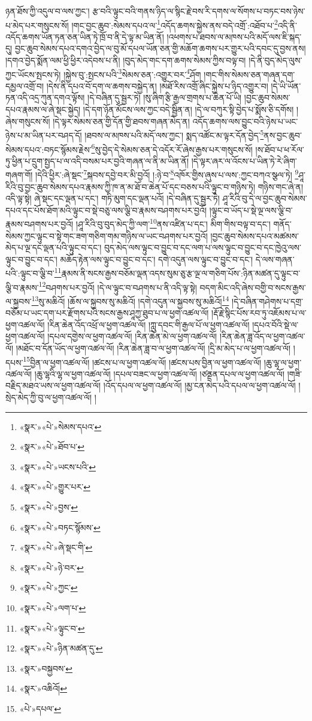 ཉན་ཐོས་ཀྱི་འདུལ་བ་ལས་ཀྱང་། རྩ་བའི་ལྟུང་བའི་གནས་ཉིད་ལ་སྙིང་རྗེ་བས་རི་དགས་ལ་སོགས་པ་བཏང་བས་ཉེས་པ་མེད་པར་གསུངས་སོ། །གང་བྱང་ཆུབ་:སེམས་དཔའ་ལ་\footnote{«སྣར་»«པེ་»སེམས་དཔའ་}འདོད་ཆགས་སྐྱེས་ནས་བདེ་འགྲོ་:འཐོབ་པ་\footnote{«སྣར་»«པེ་»ཐོབ་པ་}འདི་ནི་འདོད་ཆགས་ཡོན་ཏན་ཅན་ཡིན་ཏེ་ཁྲོ་བ་ནི་དེ་ལྟ་མ་ཡིན་ནོ། །འཕགས་པ་ཐབས་ལ་མཁས་པའི་མདོ་ལས་ཇི་སྐད་དུ། བྱང་ཆུབ་སེམས་དཔའ་དགའ་བྱེད་ལ་བུ་མོ་དཔལ་ཡོན་ཅན་གྱི་མཆོག་ཆགས་པར་གྱུར་པའི་དབང་དུ་བྱས་ནས། །དགའ་བྱེད་སྨོན་ལམ་ཕྱི་ཕྱིར་འདེབས་པ་ནི། །བུད་མེད་གང་དག་ཆགས་སེམས་ཀྱིས་བལྟ་བ། །དེ་ནི་བུད་མེད་ལུས་ཀྱང་ཡོངས་སྤངས་ཏེ། །སྐྱེས་བུ་:སྤངས་པའི་\footnote{«སྣར་»«པེ་»ཡངས་པའི་}སེམས་ཅན་:འགྱུར་བར་\footnote{«སྣར་»«པེ་»གྱུར་པར་}ཤོག །གང་གིས་སེམས་ཅན་གཞན་དག་དམྱལ་འགྲོ་བ། །དེས་ནི་དཔའ་བོ་དག་ལ་ཆགས་བསྐྱེད་ན། །མཐོ་རིས་འགྲོ་ཞིང་སྐྱེས་པ་ཉིད་འགྱུར་བ། །དེ་ཡི་ཡོན་ཏན་འདི་འདྲ་ཀུན་དགའ་ལྟོས། །དེ་བཞིན་དུ་སྦྱར་ཏེ། །སུ་ཞིག་རྩི་རྒྱལ་གྲགས་པ་ཆེན་པོ་ཡི། །བྱང་ཆུབ་སེམས་དཔའ་རྣམས་ལ་ཞེ་སྡང་སྐྱེད། །དེ་དག་ཉོན་མོངས་ལས་ཀྱང་བདེ་སྦྱིན་ན། །དེ་ལ་བཀུར་སྟི་བྱེད་པ་སྨོས་ཅི་དགོས། །ཞེས་གསུངས་སོ། །དེ་ལྟར་སེམས་ཅན་གྱི་དོན་གྱི་ཐབས་གཞན་མེད་ན། འདོད་ཆགས་ལས་བྱུང་བའི་ཉེས་པ་ཡང་ཉེས་པ་མ་ཡིན་པར་བཤད་དོ། །ཐབས་ལ་མཁས་པའི་མདོ་ལས་ཀྱང་། སྨད་འཚོང་མ་ལྟར་དོན་བྱེད་\footnote{«སྣར་»«པེ་»བྱས་}ནས་བྱང་ཆུབ་སེམས་དཔའ་:བཏང་སྙོམས་རྗེས་\footnote{«སྣར་»«པེ་»བཏང་སྙོམས་}སུ་བྱེད་དེ་སེམས་ཅན་དེ་འདོར་རོ་ཞེས་རྒྱས་པར་གསུངས་སོ། །ས་ཐོབ་པ་ཕ་རོལ་ཏུ་ཕྱིན་པ་དྲུག་སྤྱད་པ་ལ་འདི་བསམ་པར་བྱའི་གཞན་ལ་ནི་མ་ཡིན་ནོ། །དེ་ལྟར་ཞར་ལ་འོངས་པ་ཡིན་ཏེ་རེ་ཞིག་གཞག་གོ། །དེའི་ཕྱིར་:ཞེ་སྡང་\footnote{«སྣར་»«པེ་»ཞེ་སྡང་གི་}སྐབས་དབྱེ་བར་མི་བྱའོ། །:ཉེ་བ་\footnote{«སྣར་»«པེ་»ཉེ་བར་}འཁོར་གྱིས་ཞུས་པ་ལས་:ཀྱང་བཀའ་སྩལ་ཏེ། \footnote{«སྣར་»«པེ་»ཀྱང་}ཤཱ་རིའི་བུ་བྱང་ཆུབ་སེམས་དཔའ་རྣམས་ཀྱི་ཁ་ན་མ་ཐོ་བ་ཆེན་པོ་དང་བཅས་པའི་ལྟུང་བ་གཉིས་ཏེ། གཉིས་གང་ཞེ་ན། འདི་ལྟ་སྟེ། ཞེ་སྡང་དང་ལྡན་པ་དང་། གཏི་མུག་དང་ལྡན་པའོ། །དེ་བཞིན་དུ་སྦྱར་ཏེ། ཤཱ་རིའི་བུ་དེ་ལ་བྱང་ཆུབ་སེམས་དཔའ་དང་པོས་ཐོག་མའི་ལྟུང་བ་སྡེ་བཅུ་ལས་ལྕི་བ་རྣམས་བཤགས་པར་བྱའོ། །ལྟུང་བ་ཡོད་པ་སྡེ་ལྔ་ལས་ལྕི་བ་རྣམས་བཤགས་པར་བྱའོ། །ཤཱ་རིའི་བུ་བུད་མེད་ཀྱི་ལག་\footnote{«སྣར་»«པེ་»ལག་པ་}ནས་འཛིན་པ་དང་། མིག་གིས་བལྟ་བ་དང་། གནོད་སེམས་ཀྱང་ལྟུང་བ་སྟེ་གང་ཟག་གཅིག་གམ་གཉིས་ལ་ཡང་བཤགས་པར་བྱའོ། །བྱང་ཆུབ་སེམས་དཔའ་མཚམས་མེད་པ་ལྔ་དང་ལྡན་པའི་ལྟུང་བ་དང་། བུད་མེད་ལས་ལྟུང་བ་བྱུང་བ་དང་ལག་པ་ལས་ལྟུང་བ་བྱུང་བ་དང་ཁྱེའུ་ལས་ལྟུང་བ་བྱུང་བ་དང་། མཆོད་རྟེན་ལས་ལྟུང་བ་བྱུང་བ་དང་། དགེ་འདུན་ལས་ལྟུང་བ་བྱུང་བ་དང་། དེ་ལས་གཞན་པའི་:ལྟུང་བ་ལྕི་བ་\footnote{«སྣར་»«པེ་»ལྟུང་བ་}རྣམས་ནི་སངས་རྒྱས་བཅོམ་ལྡན་འདས་སུམ་ཅུ་རྩ་ལྔ་ལ་གཅིག་པོས་:ཉིན་མཚན་དུ་ལྟུང་བ་ལྕི་བ་རྣམས་\footnote{«སྣར་»«པེ་»ཉིན་མཚན་དུ་}བཤགས་པར་བྱའོ། །དེ་ལ་ལྟུང་བ་བཤགས་པ་ནི་འདི་ལྟ་སྟེ། བདག་མིང་འདི་ཞེས་བགྱི་བ་སངས་རྒྱས་ལ་སྐྱབས་\footnote{«སྣར་»བསྐྱབས་}སུ་མཆིའོ། །ཆོས་ལ་སྐྱབས་སུ་མཆིའོ། །དགེ་འདུན་ལ་སྐྱབས་སུ་མཆིའོ།\footnote{«སྣར་»འཆིའོ།} །དེ་བཞིན་གཤེགས་པ་དགྲ་བཅོམ་པ་ཡང་དག་པར་རྫོགས་པའི་སངས་རྒྱས་ཤཱཀྱ་ཐུབ་པ་ལ་ཕྱག་འཚལ་ལོ། །རྡོ་རྗེ་སྙིང་པོས་རབ་ཏུ་འཇོམས་པ་ལ་ཕྱག་འཚལ་ལོ། །རིན་ཆེན་འོད་འཕྲོ་ལ་ཕྱག་འཚལ་ལོ། །ཀླུ་དབང་གི་རྒྱལ་པོ་ལ་ཕྱག་འཚལ་ལོ། །དཔའ་བོའི་སྡེ་ལ་ཕྱག་འཚལ་ལོ། །དཔལ་དགྱེས་ལ་ཕྱག་འཚལ་ལོ། །རིན་ཆེན་མེ་ལ་ཕྱག་འཚལ་ལོ། །རིན་ཆེན་ཟླ་འོད་ལ་ཕྱག་འཚལ་ལོ། །མཐོང་བ་དོན་ཡོད་ལ་ཕྱག་འཚལ་ལོ། །རིན་ཆེན་ཟླ་བ་ལ་ཕྱག་འཚལ་ལོ། །དྲི་མ་མེད་པ་ལ་ཕྱག་འཚལ་ལོ། །དཔས་\footnote{«པེ་»དཔལ་}བྱིན་ལ་ཕྱག་འཚལ་ལོ། །ཚངས་པ་ལ་ཕྱག་འཚལ་ལོ། །ཚངས་པས་བྱིན་ལ་ཕྱག་འཚལ་ལོ། །ཆུ་ལྷ་ལ་ཕྱག་འཚལ་ལོ། །ཆུ་ལྷའི་ལྷ་ལ་ཕྱག་འཚལ་ལོ། །དཔལ་བཟང་ལ་ཕྱག་འཚལ་ལོ། །ཙནྡན་དཔལ་ལ་ཕྱག་འཚལ་ལོ། །གཟི་བརྗིད་མཐའ་ཡས་ལ་ཕྱག་འཚལ་ལོ། །འོད་དཔལ་ལ་ཕྱག་འཚལ་ལོ། །མྱ་ངན་མེད་པའི་དཔལ་ལ་ཕྱག་འཚལ་ལོ། །སྲེད་མེད་ཀྱི་བུ་ལ་ཕྱག་འཚལ་ལོ། །
